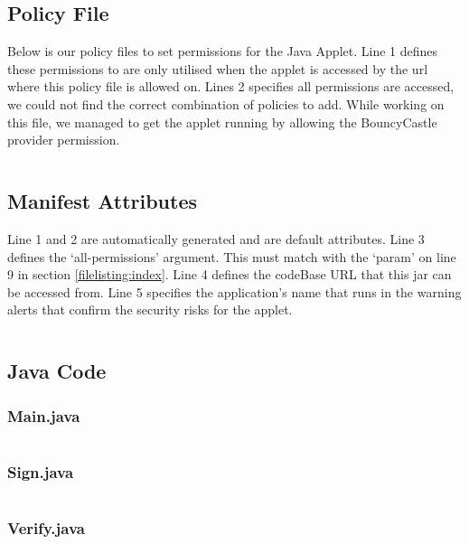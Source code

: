 \inputminted[linenos]{html}{source/index.html}


\subsection{Policy File}
Below is our policy files to set permissions for the Java Applet. Line 1 defines these permissions to are only utilised when the applet is accessed by the url where this policy file is allowed on. Lines 2 specifies all permissions are accessed, we could not find the correct combination of policies to add. While working on this file, we managed to get the applet running by allowing the BouncyCastle provider permission.

\inputminted[linenos]{text}{source/src/.java.policy}


\subsection{Manifest Attributes}

Line 1 and 2 are automatically generated and are default attributes. Line 3 defines the `all-permissions' argument. This must match with the `param' on line 9 in section \ref{filelisting:index}. Line 4 defines the codeBase URL that this jar can be accessed from. Line 5 specifies the application's name that runs in the warning alerts that confirm the security risks for the applet.

\inputminted[linenos]{text}{source/MANIFEST.txt}



\subsection{Java Code}

\subsubsection{Main.java}
\inputminted[linenos]{java}{source/src/Main.java}

\subsubsection{Sign.java}
\label{filelisting:sign}
\inputminted[linenos]{java}{source/src/Sign.java}

\subsubsection{Verify.java}
\inputminted[linenos]{java}{source/src/Verify.java}

